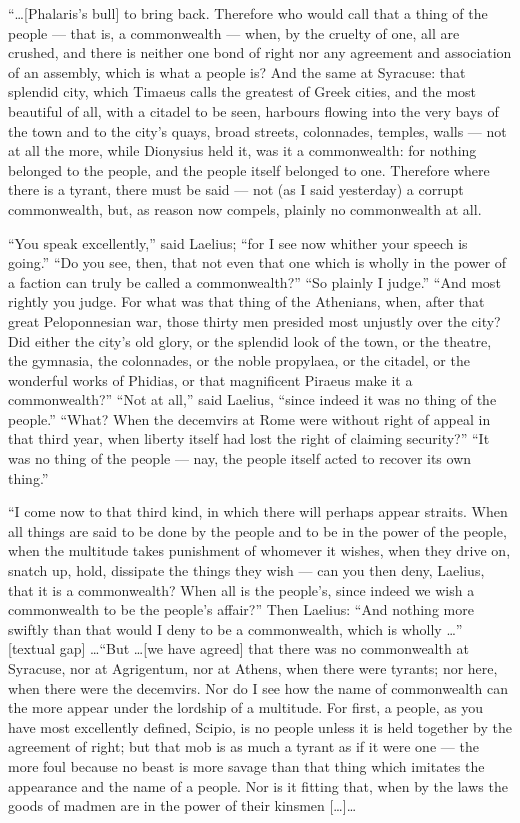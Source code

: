  ``\ldots [Phalaris's bull] to bring back. Therefore who would call that a thing of the people --- that is, a commonwealth --- when, by the cruelty of one, all are crushed, and there is neither one bond of right nor any agreement and association of an assembly, which is what a people is? And the same at Syracuse: that splendid city, which Timaeus calls the greatest of Greek cities, and the most beautiful of all, with a citadel to be seen, harbours flowing into the very bays of the town and to the city's quays, broad streets, colonnades, temples, walls --- not at all the more, while Dionysius held it, was it a commonwealth: for nothing belonged to the people, and the people itself belonged to one. Therefore where there is a tyrant, there must be said --- not (as I said yesterday) a corrupt commonwealth, but, as reason now compels, plainly no commonwealth at all.

 ``You speak excellently,'' said Laelius; ``for I see now whither your speech is going.'' ``Do you see, then, that not even that one which is wholly in the power of a faction can truly be called a commonwealth?'' ``So plainly I judge.'' ``And most rightly you judge. For what was that thing of the Athenians, when, after that great Peloponnesian war, those thirty men presided most unjustly over the city? Did either the city's old glory, or the splendid look of the town, or the theatre, the gymnasia, the colonnades, or the noble propylaea, or the citadel, or the wonderful works of Phidias, or that magnificent Piraeus make it a commonwealth?'' ``Not at all,'' said Laelius, ``since indeed it was no thing of the people.'' ``What? When the decemvirs at Rome were without right of appeal in that third year, when liberty itself had lost the right of claiming security?'' ``It was no thing of the people --- nay, the people itself acted to recover its own thing.''

 ``I come now to that third kind, in which there will perhaps appear straits. When all things are said to be done by the people and to be in the power of the people, when the multitude takes punishment of whomever it wishes, when they drive on, snatch up, hold, dissipate the things they wish --- can you then deny, Laelius, that it is a commonwealth? When all is the people's, since indeed we wish a commonwealth to be the people's affair?'' Then Laelius: ``And nothing more swiftly than that would I deny to be a commonwealth, which is wholly \ldots'' [textual gap] \ldots ``But \ldots [we have agreed] that there was no commonwealth at Syracuse, nor at Agrigentum, nor at Athens, when there were tyrants; nor here, when there were the decemvirs. Nor do I see how the name of commonwealth can the more appear under the lordship of a multitude. For first, a people, as you have most excellently defined, Scipio, is no people unless it is held together by the agreement of right; but that mob is as much a tyrant as if it were one --- the more foul because no beast is more savage than that thing which imitates the appearance and the name of a people. Nor is it fitting that, when by the laws the goods of madmen are in the power of their kinsmen [\ldots]\ldots

